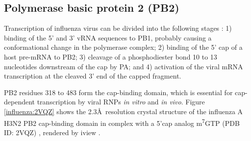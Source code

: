 
\subsection{Polymerase basic protein 2 (PB2)}

Transcription of influenza virus can be divided into the following stages \citep{1236}: 1) binding of the 5' and 3' vRNA sequences to PB1, probably causing a conformational change in the polymerase complex; 2) binding of the 5' cap of a host pre-mRNA to PB2; 3) cleavage of a phosphodiester bond 10 to 13 nucleotides downstream of the cap by PA; and 4) activation of the viral mRNA transcription at the cleaved 3' end of the capped fragment.

PB2 residues 318 to 483 form the cap-binding domain, which is essential for cap-dependent transcription by viral RNPs \textit{in vitro} and \textit{in vivo}. Figure \ref{influenza:2VQZ} shows the 2.3\AA\ resolution crystal structure of the influenza A H3N2 PB2 cap-binding domain in complex with a 5'cap analog m\textsuperscript{7}GTP (PDB ID: 2VQZ) \citep{1192}, rendered by iview \citep{1366}.

